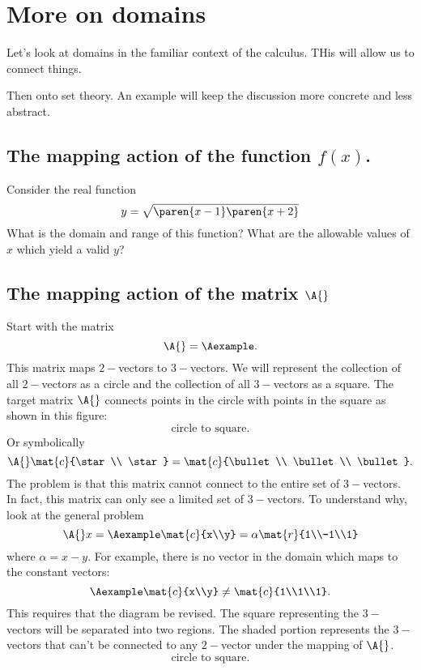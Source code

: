 \section{More on domains}
Let's look at domains in the familiar context of the calculus. THis will allow us to connect things.

Then onto set theory. An example will keep the discussion more concrete and less abstract.

\subsection{The mapping action of the function $f(x)$.}
Consider the real function
\begin{equation}
  y=\sqrt{\paren{x-1}\paren{x+2}}
\end{equation}
What is the domain and range of this function? What are the allowable values of $x$ which yield a valid $y$?

\subsection{The mapping action of the matrix $\A{}$}
Start with the matrix 
\begin{equation}
  \A{}= \Aexample.
\end{equation}
This matrix maps $2-$vectors to $3-$vectors. We will represent the collection of all $2-$vectors as a circle and the collection of all $3-$vectors as a square. The target matrix $\A{}$ connects points in the circle with points in the square as shown in this figure:
$$
\text{circle to square}.
$$
Or symbolically
\begin{equation}
  \A{} \mat{c}{\star \\ \star} = \mat{c}{\bullet \\ \bullet \\ \bullet }.
\end{equation}
The problem is that this matrix cannot connect to the entire set of $3-$vectors. In fact, this matrix can only see a limited set of $3-$vectors. To understand why, look at the general problem
\begin{equation}
  \A{} x = \Aexample \mat{c}{x\\y} = \alpha\mat{r}{1\\-1\\1}
\end{equation}
where $\alpha = x-y$. For example, there is no vector in the domain which maps to the constant vectors:
\begin{equation}
  \Aexample \mat{c}{x\\y} \ne \mat{c}{1\\1\\1}.
\end{equation}
This requires that the diagram be revised. The square representing the $3-$vectors will be separated into two regions. The shaded portion represents the $3-$vectors that can't be connected to any $2-$vector under the mapping of $\A{}$.
$$
\text{circle to square}.
$$


\endinput